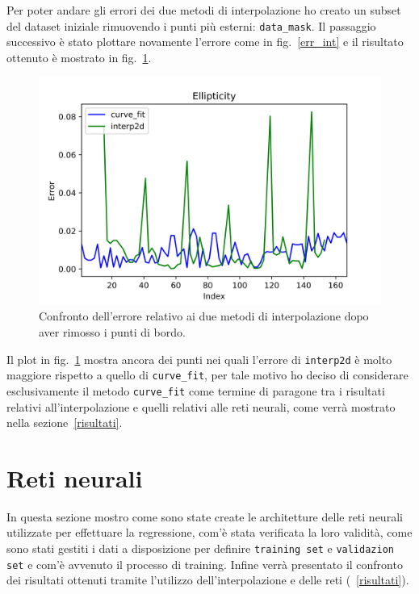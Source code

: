 \documentclass[12pt,a4paper,final]{book}
\begin{document}
Per poter andare gli errori dei due metodi di interpolazione ho creato un subset del dataset iniziale rimuovendo i punti più esterni: \texttt{data\_mask}. Il passaggio successivo è stato plottare novamente l'errore come in fig.~\ref{err_int} e il risultato ottenuto è mostrato in fig.~\ref{err_int_mask}.

\begin{figure}[!ht]
	\centering
	\includegraphics[scale=0.8]{../figures/error_comparison.png}
	\caption{Confronto dell'errore relativo ai due metodi di interpolazione dopo aver rimosso i punti di bordo.}
	\label{err_int_mask}
\end{figure}

Il plot in fig.~\ref{err_int_mask} mostra ancora dei punti nei quali l'errore di \texttt{interp2d} è molto maggiore rispetto a quello di \texttt{curve\_fit}, per tale motivo ho deciso di considerare esclusivamente il metodo \texttt{curve\_fit} come termine di paragone tra i risultati relativi all'interpolazione e quelli relativi alle reti neurali, come verrà mostrato nella sezione~\ref{risultati}.


\section{Reti neurali}\label{reti_neurali}
In questa sezione mostro come sono state create le architetture delle reti neurali utilizzate per effettuare la regressione, com'è stata verificata la loro validità, come sono stati gestiti i dati a disposizione per definire \texttt{training set} e \texttt{validazion set} e com'è avvenuto il processo di training. Infine verrà presentato il confronto dei risultati ottenuti tramite l'utilizzo dell'interpolazione e delle reti (~\ref{risultati}).
\end{document}
